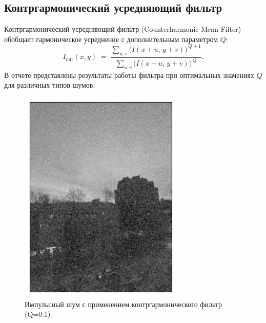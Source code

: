 \documentclass[a4paper,12pt]{article}
\begin{document}
\subsection{Контргармонический усредняющий фильтр}
Контргармонический усредняющий фильтр (Counterharmonic Mean Filter) обобщает гармоническое усреднение с дополнительным параметром \(Q\):
\begin{equation}
I_{\text{out}}(x,y) \;=\;
\frac{\displaystyle \sum_{u,v} \bigl(I(x+u,\,y+v)\bigr)^{\,Q+1}}
{\displaystyle \sum_{u,v} \bigl(I(x+u,\,y+v)\bigr)^{\,Q}}.
\end{equation}
В отчете представлены результаты работы фильтра при оптимальных значениях \(Q\) для различных типов шумов.
\begin{figure}[H]
    \begin{minipage}{0.49\textwidth}
        \centering \includegraphics[width=\textwidth]{results/lpf_sap_4.png}
        \caption{Импульсный шум с применением контргармонического фильтр (Q=0.1)}
    \end{minipage}\hfill

\end{figure}
\end{document}
